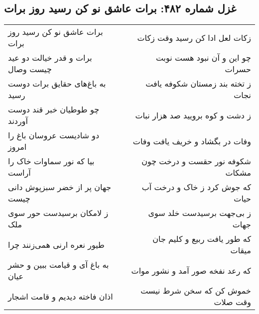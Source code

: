 \begin{center}
\section*{غزل شماره ۴۸۲: برات عاشق نو کن رسید روز برات}
\label{sec:0482}
\begin{longtable}{l p{0.5cm} r}
برات عاشق نو کن رسید روز برات
&&
زکات لعل ادا کن رسید وقت زکات
\\
برات و قدر خیالت دو عید چیست وصال
&&
چو این و آن نبود هست نوبت حسرات
\\
به باغ‌های حقایق برات دوست رسید
&&
ز تخته بند زمستان شکوفه یافت نجات
\\
چو طوطیان خبر قند دوست آوردند
&&
ز دشت و کوه برویید صد هزار نبات
\\
دو شادیست عروسان باغ را امروز
&&
وفات در بگشاد و خریف یافت وفات
\\
بیا که نور سماوات خاک را آراست
&&
شکوفه نور حقست و درخت چون مشکات
\\
جهان پر از خضر سبزپوش دانی چیست
&&
که جوش کرد ز خاک و درخت آب حیات
\\
ز لامکان برسیدست حور سوی ملک
&&
ز بی‌جهت برسیدست خلد سوی جهات
\\
طیور نعره ارنی همی‌زنند چرا
&&
که طور یافت ربیع و کلیم جان میقات
\\
به باغ آی و قیامت ببین و حشر عیان
&&
که رعد نفخه صور آمد و نشور موات
\\
اذان فاخته دیدیم و قامت اشجار
&&
خموش کن که سخن شرط نیست وقت صلات
\\
\end{longtable}
\end{center}
